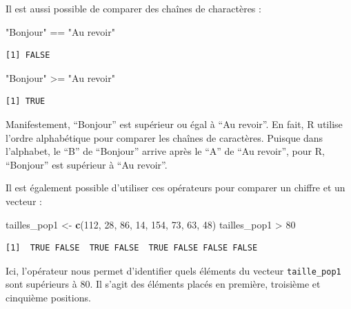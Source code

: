 \documentclass[a4paperpaper,]{article}
\newenvironment{Shaded}{\begin{snugshade}}{\end{snugshade}}
\newcommand{\DecValTok}[1]{\textcolor[rgb]{0.69,0.50,0.00}{#1}}
\newcommand{\KeywordTok}[1]{\textcolor[rgb]{0.12,0.11,0.11}{\textbf{#1}}}
\newcommand{\NormalTok}[1]{\textcolor[rgb]{0.12,0.11,0.11}{#1}}
\newcommand{\OperatorTok}[1]{\textcolor[rgb]{0.12,0.11,0.11}{#1}}
\newcommand{\StringTok}[1]{\textcolor[rgb]{0.75,0.01,0.01}{#1}}
\begin{document}
Il est aussi possible de comparer des chaînes de charactères :

\begin{Shaded}
\begin{Highlighting}[]
\StringTok{"Bonjour"} \OperatorTok{==}\StringTok{ "Au revoir"}
\end{Highlighting}
\end{Shaded}

\begin{verbatim}
[1] FALSE
\end{verbatim}

\begin{Shaded}
\begin{Highlighting}[]
\StringTok{"Bonjour"} \OperatorTok{>=}\StringTok{ "Au revoir"}
\end{Highlighting}
\end{Shaded}

\begin{verbatim}
[1] TRUE
\end{verbatim}

Manifestement, ``Bonjour'' est supérieur ou égal à ``Au revoir''. En fait, R utilise l'ordre alphabétique pour comparer les chaînes de caractères. Puisque dans l'alphabet, le ``B'' de ``Bonjour'' arrive après le ``A'' de ``Au revoir'', pour R, ``Bonjour'' est supérieur à ``Au revoir''.

Il est également possible d'utiliser ces opérateurs pour comparer un chiffre et un vecteur :

\begin{Shaded}
\begin{Highlighting}[]
\NormalTok{tailles_pop1 <-}\StringTok{ }\KeywordTok{c}\NormalTok{(}\DecValTok{112}\NormalTok{, }\DecValTok{28}\NormalTok{, }\DecValTok{86}\NormalTok{, }\DecValTok{14}\NormalTok{, }\DecValTok{154}\NormalTok{, }\DecValTok{73}\NormalTok{, }\DecValTok{63}\NormalTok{, }\DecValTok{48}\NormalTok{)}
\NormalTok{tailles_pop1 }\OperatorTok{>}\StringTok{ }\DecValTok{80}
\end{Highlighting}
\end{Shaded}

\begin{verbatim}
[1]  TRUE FALSE  TRUE FALSE  TRUE FALSE FALSE FALSE
\end{verbatim}

Ici, l'opérateur nous permet d'identifier quels éléments du vecteur \texttt{taille\_pop1} sont supérieurs à 80. Il s'agit des éléments placés en première, troisième et cinquième positions.
\end{document}
